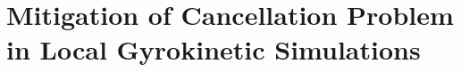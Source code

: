 \chapter{Mitigation of Cancellation Problem in Local Gyrokinetic Simulations}
\label{chap:methods}

\thispagestyle{empty}
\newpage